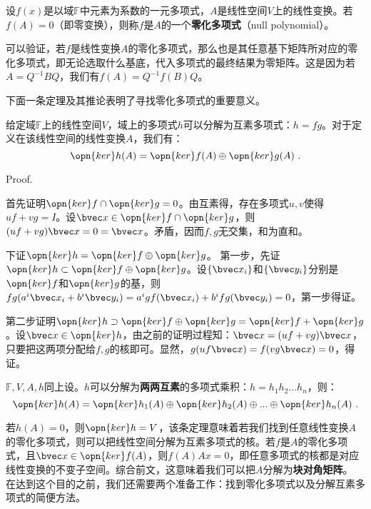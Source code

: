 

\begin{issues}
\issueDraft 
\end{issues}

\begin{definition}{}
设$f(x)$是以域$\mathbb F$中元素为系数的一元多项式，$A$是线性空间$V$上的线性变换。若$f(A)=0$（即零变换），则称$f$是$A$的一个\textbf{零化多项式}（null polynomial）。
\end{definition}
可以验证，若$f$是线性变换$A$的零化多项式，那么也是其任意基下矩阵所对应的零化多项式，即无论选取什么基底，代入多项式的最终结果为零矩阵。这是因为若$A=Q^{-1}BQ$，我们有$f(A)=Q^{-1}f(B)Q$。


下面一条定理及其推论表明了寻找零化多项式的重要意义。
\begin{theorem}{}
给定域$\mathbb F$上的线性空间$V$，域上的多项式$h$可以分解为互素多项式：$h=fg$。对于定义在该线性空间的线性变换$A$，我们有：
\begin{equation}
\opn{ker}h(A)=\opn{ker}f(A)\oplus\opn{ker}g(A)~.
\end{equation}
\end{theorem}
Proof.

首先证明$\opn{ker}f\cap \opn{ker}g=0$。由互素得，存在多项式$u,v$使得$uf+vg=I$。设$\bvec x\in \opn{ker}f\cap \opn{ker}g$，则$(uf+vg)\bvec x=0=\bvec x$。矛盾，因而$f,g$无交集，和为直和。

下证$\opn{ker}h=\opn{ker}f\oplus\opn{ker}g$。
第一步，先证$\opn{ker}h\subset\opn{ker}f\oplus\opn{ker}g$。设$\{\bvec x_i\}$和$\{\bvec y_i\}$分别是$\opn{ker}f$和$\opn{ker}g$的基，则$fg(a^i\bvec x_i+b^i \bvec y_i)=a^igf(\bvec x_i)+b^ifg(\bvec y_i)=0$，第一步得证。

第二步证明$\opn{ker}h\supset\opn{ker}f\oplus\opn{ker}g=\opn{ker}f+\opn{ker}g$。设$\bvec x\in \opn{ker}h$，由之前的证明过程知：$\bvec x=(uf+vg)\bvec x$，只要把这两项分配给$f,g$的核即可。显然，$g(uf\bvec x)=f(vg\bvec x) =0$，得证。

\begin{corollary}{}
$\mathbb F,V,A,h$同上设。$h$可以分解为\textbf{两两互素}的多项式乘积：$h=h_1h_2...h_n$，则：
\begin{equation}
\opn{ker}h(A)=\opn{ker}h_1(A)\oplus\opn{ker}h_2(A)\oplus...\oplus\opn{ker}h_n(A)~.
\end{equation}
\end{corollary}

若$h(A)=0$，则$\opn{ker} h=V$，该条定理意味着若我们找到任意线性变换$A$的零化多项式，则可以把线性空间分解为互素多项式的核。若$f$是$A$的零化多项式，且$\bvec x\in \opn{ker}f(A)$，则$f(A)A x=0$，即任意多项式的核都是对应线性变换的不变子空间。综合前文，这意味着我们可以把$A$分解为\textbf{块对角矩阵}。
在达到这个目的之前，我们还需要两个准备工作：找到零化多项式以及分解互素多项式的简便方法。

